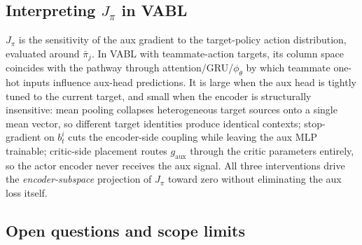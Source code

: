 \documentclass{article}
\theoremstyle{plain}
\theoremstyle{definition}
\theoremstyle{remark}
\begin{document}
\subsection{Interpreting $J_\pi$ in VABL}
\label{app:theory_jpi}

$J_\pi$ is the sensitivity of the aux gradient to the
target-policy action distribution, evaluated around $\bar\pi_j$. In
VABL with teammate-action targets, its column space coincides with
the pathway through attention/GRU/$\phi_\theta$ by which teammate
one-hot inputs influence aux-head predictions. It is large when the
aux head is tightly tuned to the current target, and small when
the encoder is structurally insensitive: mean pooling collapses
heterogeneous target sources onto a single mean vector, so
different target identities produce identical contexts;
stop-gradient on $b_t^i$ cuts the encoder-side coupling while
leaving the aux MLP trainable; critic-side placement routes
$g_{\mathrm{aux}}$ through the critic parameters entirely, so the
actor encoder never receives the aux signal. All three interventions drive the \emph{encoder-subspace}
projection of $J_\pi$ toward zero without eliminating the aux loss
itself.

\subsection{Open questions and scope limits}
\label{app:theory_scope}
\end{document}
